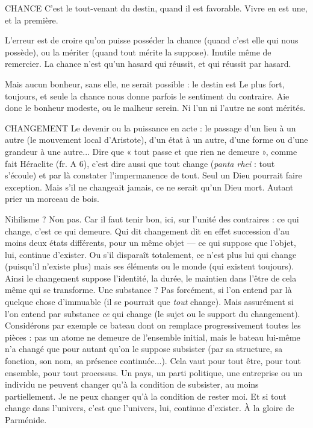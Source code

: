 CHANCE C'est le tout-venant du destin, quand il est favorable. Vivre en est
une, et la première.

L'erreur est de croire qu’on puisse posséder la chance (quand c’est elle qui
nous possède), ou la mériter (quand tout mérite la suppose). Inutile même de
remercier. La chance n’est qu’un hasard qui réussit, et qui réussit par hasard.

Mais aucun bonheur, sans elle, ne serait possible : le destin est Le plus fort,
toujours, et seule la chance nous donne parfois le sentiment du contraire. Aie
donc le bonheur modeste, ou le malheur serein. Ni l’un ni l’autre ne sont
mérités.

CHANGEMENT Le devenir ou la puissance en acte : le passage d’un lieu à
un autre (le mouvement local d’Aristote), d’un état à un
autre, d’une forme ou d’une grandeur à une autre... Dire que « tout passe et
que rien ne demeure », comme fait Héraclite (fr. A 6), c’est dire aussi que tout
change ({\it panta rhei} : tout s’écoule) et par là constater l’impermanence de tout.
Seul un Dieu pourrait faire exception. Mais s’il ne changeait jamais, ce ne serait
qu’un Dieu mort. Autant prier un morceau de bois.

Nihilisme ? Non pas. Car il faut tenir bon, ici, sur l’unité des contraires : ce
qui change, c’est ce qui demeure. Qui dit changement dit en effet succession
d’au moins deux états différents, pour un même objet — ce qui suppose que
l’objet, lui, continue d’exister. Ou s’il disparaît totalement, ce n’est plus lui qui
change (puisqu'il n’existe plus) mais ses éléments ou le monde (qui existent
toujours). Ainsi le changement suppose l'identité, la durée, le maintien dans
l’être de cela même qui se transforme. Une substance ? Pas forcément, si l’on
entend par là quelque chose d’immuable (il se pourrait que {\it tout} change). Mais
assurément si l’on entend par substance {\it ce} qui change (le sujet ou le support du
changement). Considérons par exemple ce bateau dont on remplace progressivement
toutes les pièces : pas un atome ne demeure de l’ensemble initial, mais
le bateau lui-même n’a changé que pour autant qu’on le suppose subsister (par
sa structure, sa fonction, son nom, sa présence continuée...). Cela vaut pour
tout être, pour tout ensemble, pour tout processus. Un pays, un parti politique,
une entreprise ou un individu ne peuvent changer qu’à la condition de subsister,
au moins partiellement. Je ne peux changer qu’à la condition de rester
moi. Et si tout change dans l’univers, c’est que l’univers, lui, continue d’exister.
À la gloire de Parménide.

